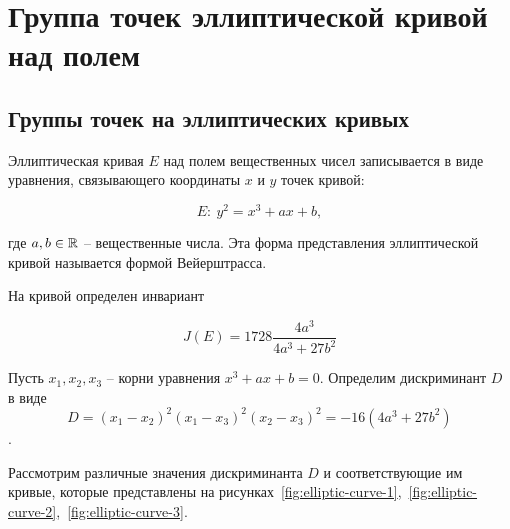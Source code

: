 \section{Группа точек эллиптической кривой над полем}

\subsection{Группы точек на эллиптических кривых}

Эллиптическая кривая $E$ над полем вещественных чисел записывается в виде уравнения, связывающего координаты $x$ и $y$ точек кривой:

\begin{equation}
    E: ~ y^{2} = x^{3} + ax + b,
    \label{Wer}
\end{equation}

где $a,b \in \mathbb{R}$ -- вещественные числа. Эта форма представления эллиптической кривой называется формой Вейерштрасса.

На кривой определен инвариант

\begin{equation}
    J(E)=1728\frac{4a^{3} }{4a^{3} +27b^{2} }
\end{equation}

Пусть $x_{1} ,x_{2} ,x_{3} $ -- корни уравнения $x^3 + a x + b = 0$. Определим дискриминант $D$ в виде
    \[ D =(x_1 - x_2)^2 (x_1 - x_3)^2 (x_2 - x_3)^2 = - 16(4 a^3 + 27 b^2) \].

Рассмотрим различные значения дискриминанта $D$ и соответствующие им кривые, которые представлены на рисунках~\ref{fig:elliptic-curve-1},~\ref{fig:elliptic-curve-2},~\ref{fig:elliptic-curve-3}.

